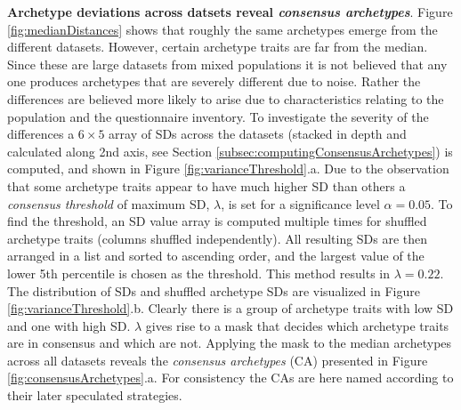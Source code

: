 \textbf{Archetype deviations across datsets reveal \textit{consensus archetypes}}. 
Figure \ref{fig:medianDistances} shows that roughly the same archetypes emerge from the different datasets.
However, certain archetype traits are far from the median.
Since these are large datasets from mixed populations it is not believed that any one produces archetypes that are severely different due to noise.
Rather the differences are believed more likely to arise due to characteristics relating to the population and the questionnaire inventory.
To investigate the severity of the differences a $6 \times 5$ array of SDs across the datasets (stacked in depth and calculated along 2nd axis, see Section \ref{subsec:computingConsensusArchetypes}) is computed, and shown in Figure \ref{fig:varianceThreshold}.a.
Due to the observation that some archetype traits appear to have much higher SD than others a \textit{consensus threshold} of maximum SD, $\lambda$, is set for a significance level $\alpha = 0.05$.
To find the threshold, an SD value array is computed multiple times for shuffled archetype traits (columns shuffled independently).
All resulting SDs are then arranged in a list and sorted to ascending order, and the largest value of the lower 5th percentile is chosen as the threshold.
This method results in $\lambda = 0.22$.
The distribution of SDs and shuffled archetype SDs are visualized in Figure \ref{fig:varianceThreshold}.b.
Clearly there is a group of archetype traits with low SD and one with high SD.
$\lambda$ gives rise to a mask that decides which archetype traits are in consensus and which are not.
Applying the mask to the median archetypes across all datasets reveals the \textit{consensus archetypes} (CA) presented in Figure \ref{fig:consensusArchetypes}.a.
For consistency the CAs are here named according to their later speculated strategies.\\

